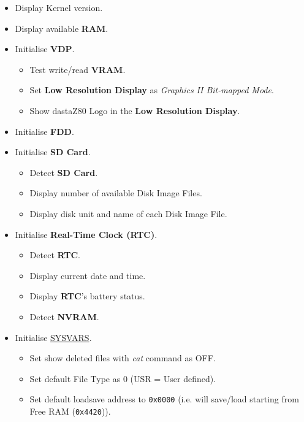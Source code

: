 \documentclass[a4paper,11pt]{article}
\begin{document}
\begin{itemize}
\begin{itemize}
            \item Display Kernel version.
            \item Display available \textbf{RAM}.
            \item Initialise \textbf{VDP}.
            \begin{itemize}
                \item Test write/read \textbf{VRAM}.
                \item Set \textbf{Low Resolution Display} as \textit{Graphics II
                Bit-mapped Mode}.
                \item Show dastaZ80 Logo in the \textbf{Low Resolution Display}.
            \end{itemize}
            \item Initialise \textbf{FDD}.
            \item Initialise \textbf{SD Card}.
            \begin{itemize}
                \item Detect \textbf{SD Card}.
                \item Display number of available Disk Image Files.
                \item Display disk unit and name of each Disk Image File.
            \end{itemize}
            \item Initialise \textbf{Real-Time Clock (RTC)}.
            \begin{itemize}
                \item Detect \textbf{RTC}.
                \item Display current date and time.
                \item Display \textbf{RTC}'s battery status.
                \item Detect \textbf{NVRAM}.
            \end{itemize}
            \item Initialise \hyperref[sec:ram_memmap]{SYSVARS}.
            \begin{itemize}
                \item Set show deleted files with \textit{cat} command as OFF.
                \item Set default File Type as 0 (USR = User defined).
                \item Set default loadsave address to \texttt{0x0000} (i.e. will
                save/load starting from Free RAM (\texttt{0x4420})).
            \end{itemize}

\end{itemize}
\end{itemize}
\end{document}

